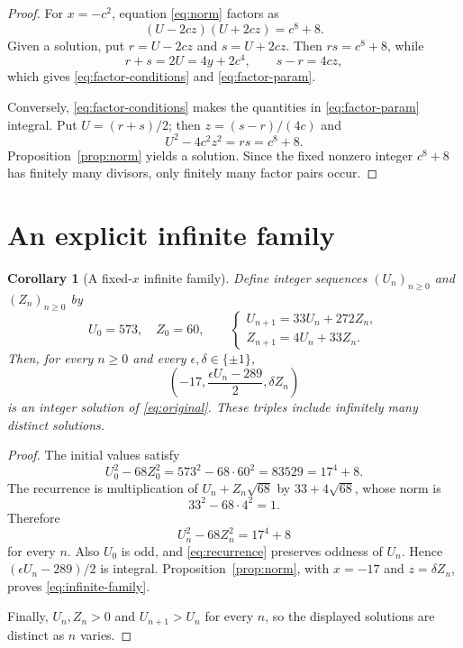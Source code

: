 \documentclass[11pt]{article}
\newtheorem{corollary}[theorem]{Corollary}
\theoremstyle{remark}
\begin{document}
\begin{proof}
For $x=-c^2$, equation \eqref{eq:norm} factors as
\[
 (U-2cz)(U+2cz)=c^8+8.
\]
Given a solution, put $r=U-2cz$ and $s=U+2cz$.  Then $rs=c^8+8$, while
\[
 r+s=2U=4y+2c^4,
 \qquad
 s-r=4cz,
\]
which gives \eqref{eq:factor-conditions} and \eqref{eq:factor-param}.

Conversely, \eqref{eq:factor-conditions} makes the quantities in \eqref{eq:factor-param} integral.  Put $U=(r+s)/2$; then $z=(s-r)/(4c)$ and
\[
 U^2-4c^2z^2=rs=c^8+8.
\]
Proposition~\ref{prop:norm} yields a solution.  Since the fixed nonzero integer $c^8+8$ has finitely many divisors, only finitely many factor pairs occur.
\end{proof}

\section{An explicit infinite family}

\begin{corollary}[A fixed-$x$ infinite family]\label{cor:infinite}
Define integer sequences $(U_n)_{n\ge0}$ and $(Z_n)_{n\ge0}$ by
\begin{equation}\label{eq:recurrence}
 U_0=573,
 \quad Z_0=60,
 \qquad
 \begin{cases}
 U_{n+1}=33U_n+272Z_n,\\
 Z_{n+1}=4U_n+33Z_n.
 \end{cases}
\end{equation}
Then, for every $n\ge0$ and every $\epsilon,\delta\in\{\pm1\}$,
\begin{equation}\label{eq:infinite-family}
 \left(
 -17,
 \frac{\epsilon U_n-289}{2},
 \delta Z_n
 \right)
\end{equation}
is an integer solution of \eqref{eq:original}.  These triples include infinitely many distinct solutions.
\end{corollary}

\begin{proof}
The initial values satisfy
\[
 U_0^2-68Z_0^2=573^2-68\cdot60^2=83529=17^4+8.
\]
The recurrence is multiplication of $U_n+Z_n\sqrt{68}$ by $33+4\sqrt{68}$, whose norm is
\[
 33^2-68\cdot4^2=1.
\]
Therefore
\[
 U_n^2-68Z_n^2=17^4+8
\]
for every $n$.  Also $U_0$ is odd, and \eqref{eq:recurrence} preserves oddness of $U_n$.  Hence $(\epsilon U_n-289)/2$ is integral.  Proposition~\ref{prop:norm}, with $x=-17$ and $z=\delta Z_n$, proves \eqref{eq:infinite-family}.

Finally, $U_n,Z_n>0$ and $U_{n+1}>U_n$ for every $n$, so the displayed solutions are distinct as $n$ varies.
\end{proof}
\end{document}
